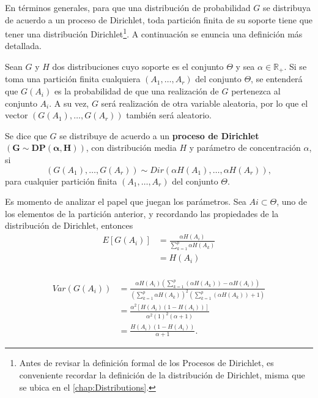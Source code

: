 En t\'erminos generales, para que una distribuci\'on de probabilidad $G$ se distribuya de acuerdo a un proceso de Dirichlet, toda partici\'on finita de su soporte tiene que tener una distribuci\'on Dirichlet\footnote{Antes de revisar la definici\'on formal de los Procesos de Dirichlet, es conveniente recordar la definici\'on de la distribuci\'on de Dirichlet, misma que se ubica en el \autoref{chap:Distributions}.}. A continuaci\'on se enuncia una definici\'on m\'as detallada.

\begin{defin}
    Sean $G$ y $H$ dos distribuciones cuyo soporte es el conjunto $\Theta$ y sea $\alpha \in \mathbb{R}_+$. Si se toma una partici\'on finita cualquiera $(A_1,\ldots,A_r)$ del conjunto $\Theta$, se entender\'a que $G(A_i)$ es la probabilidad de que una realizaci\'on de $G$ pertenezca al conjunto $A_i$.
    A su vez, $G$ ser\'a realizaci\'on de otra variable aleatoria, por lo que el vector $(G(A_1),\ldots,G(A_r))$ tambi\'en ser\'a aleatorio.
    
    Se dice que $G$ se distribuye de acuerdo a un \textbf{proceso de Dirichlet} $\bm{(G \sim DP(\alpha,H))}$, con distribuci\'on media $H$ y par\'ametro de concentraci\'on $\alpha$, si
    \begin{equation*}
        (G(A_1),\ldots,G(A_r)) \sim Dir(\alpha H(A_1),\ldots,\alpha H(A_r)), 
    \end{equation*}
    para cualquier partici\'on finita $(A_1,\ldots,A_r)$ del conjunto $\Theta$.
\end{defin}

Es momento de analizar el papel que juegan los par\'ametros. Sea $Ai \subset \Theta$, uno de los elementos de la partici\'on anterior, y recordando las propiedades de la distribuci\'on de Dirichlet, entonces
\begin{equation*}
\begin{aligned}
    E[G(A_i)] 
    &= \frac{\alpha H(A_i)}{\sum_{k=1}^p \alpha H(A_k)} \\
    &= H(A_i) \\
\end{aligned}
\end{equation*}

\begin{equation*}
\begin{aligned}
    Var(G(A_i)) 
    &= \frac{\alpha H(A_i)\left(\sum_{k=1}^p(\alpha H(A_k)) - \alpha H(A_i)\right)}
       {\left(\sum_{k=1}^p \alpha H(A_k)\right)^2\left(\sum_{k=1}^p(\alpha H(A_k)) + 1\right)} \\
    &= \frac{\alpha^2 [H(A_i)(1 - H(A_i))]}
       {\alpha^2 (1)^2(\alpha + 1)} \\
    &= \frac{H(A_i)(1 - H(A_i))}
       {\alpha + 1}.
\end{aligned}
\end{equation*}

